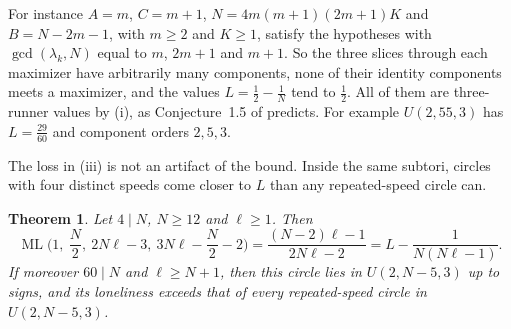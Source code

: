 \documentclass[12pt]{amsart}
\newtheorem{theorem}{Theorem}[section]
\theoremstyle{definition}\newtheorem{definition}[theorem]{Definition}
\theoremstyle{remark}\newtheorem{remark}[theorem]{Remark}
\newcommand{\ML}{\operatorname{ML}}
\begin{document}
For instance $A=m$, $C=m+1$, $N=4m(m+1)(2m+1)K$ and $B=N-2m-1$, with $m\ge2$ and $K\ge1$, satisfy the hypotheses with $\gcd(\lambda_k,N)$ equal to $m$, $2m+1$ and $m+1$. So the three slices through each maximizer have arbitrarily many components, none of their identity components meets a maximizer, and the values $L=\frac12-\frac1N$ tend to $\frac12$. All of them are three-runner values by (i), as Conjecture~1.5 of \cite{GiriKravitz} predicts. For example $U(2,55,3)$ has $L=\frac{29}{60}$ and component orders $2,5,3$.

The loss in (iii) is not an artifact of the bound. Inside the same subtori, circles with four distinct speeds come closer to $L$ than any repeated-speed circle can.

\begin{theorem}\label{thm:fourspeed}
Let $4\mid N$, $N\ge12$ and $\ell\ge1$. Then
\[
 \ML\Big(1,\ \frac N2,\ 2N\ell-3,\ 3N\ell-\frac N2-2\Big)=\frac{(N-2)\ell-1}{2N\ell-2}=L-\frac1{N(N\ell-1)}.
\]
If moreover $60\mid N$ and $\ell\ge N+1$, then this circle lies in $U(2,N-5,3)$ up to signs, and its loneliness exceeds that of every repeated-speed circle in $U(2,N-5,3)$.
\end{theorem}
\end{document}
